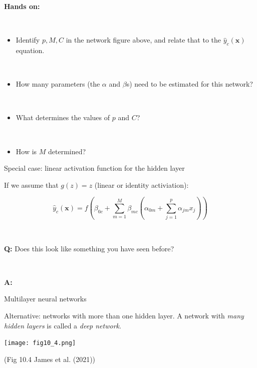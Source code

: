 \documentclass[
  10pt,
  ignorenonframetext,
]{beamer}
\providecommand{\tightlist}{%
  \setlength{\itemsep}{0pt}\setlength{\parskip}{0pt}}
\begin{document}
\begin{frame}
\textbf{Hands on:}

\(~\)

\begin{itemize}
\tightlist
\item
  Identify \(p, M, C\) in the network figure above, and relate that to
  the \(\hat{y}_{c}({\boldsymbol x})\) equation.
\end{itemize}

\(~\)

\begin{itemize}
\tightlist
\item
  How many parameters (the \(\alpha\) and \(\beta\)s) need to be
  estimated for this network?
\end{itemize}

\(~\)

\begin{itemize}
\tightlist
\item
  What determines the values of \(p\) and \(C\)?
\end{itemize}

\(~\)

\begin{itemize}
\tightlist
\item
  How is \(M\) determined?
\end{itemize}
\end{frame}

\begin{frame}
\begin{block}{Special case: linear activation function for the hidden
layer}
\protect\hypertarget{special-case-linear-activation-function-for-the-hidden-layer}{}
\(~\)

If we assume that \(g(z)=z\) (linear or identity activiation):

\[
\hat{y}_c({\boldsymbol x})= f(\beta_{0c}+\sum_{m=1}^M \beta_{mc}(\alpha_{0m}+\sum_{j=1}^p \alpha_{jm}x_{j}))
\]

\(~\) \(~\)

\textbf{Q:} Does this look like something you have seen before?

\(~\)

\textbf{A:}
\end{block}
\end{frame}

\begin{frame}
\begin{block}{Multilayer neural networks}
\protect\hypertarget{multilayer-neural-networks}{}
\(~\)

Alternative: networks with more than one hidden layer. A network with
\emph{many hidden layers} is called a \emph{deep network}.

\centering

\texttt{[image: fig10\_4.png]}

\scriptsize

(Fig 10.4 James et al. (2021))
\end{block}
\end{frame}
\end{document}
